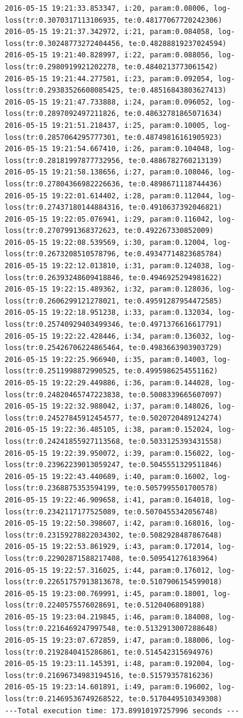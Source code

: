 \documentclass[11pt]{article}
\begin{document}
\begin{Verbatim}[commandchars=\\\{\}]
2016-05-15 19:21:33.853347, i:20, param:0.08006, log-loss(tr:0.3070317113106935, te:0.48177067720242306)
2016-05-15 19:21:37.342972, i:21, param:0.084058, log-loss(tr:0.30248773272404456, te:0.48288819237024594)
2016-05-15 19:21:40.828997, i:22, param:0.088056, log-loss(tr:0.2980919921202278, te:0.4840213773061542)
2016-05-15 19:21:44.277501, i:23, param:0.092054, log-loss(tr:0.29383526608085425, te:0.48516843803627413)
2016-05-15 19:21:47.733888, i:24, param:0.096052, log-loss(tr:0.2897092497211826, te:0.48632781865071634)
2016-05-15 19:21:51.218437, i:25, param:0.10005, log-loss(tr:0.2857064295777301, te:0.48749816161905923)
2016-05-15 19:21:54.667410, i:26, param:0.104048, log-loss(tr:0.28181997877732956, te:0.4886782760213139)
2016-05-15 19:21:58.138656, i:27, param:0.108046, log-loss(tr:0.27804366982226636, te:0.4898671118744436)
2016-05-15 19:22:01.614402, i:28, param:0.112044, log-loss(tr:0.27437180144884316, te:0.4910637392046821)
2016-05-15 19:22:05.076941, i:29, param:0.116042, log-loss(tr:0.2707991368372623, te:0.492267330852009)
2016-05-15 19:22:08.539569, i:30, param:0.12004, log-loss(tr:0.2673208510578796, te:0.49347714823685784)
2016-05-15 19:22:12.013810, i:31, param:0.124038, log-loss(tr:0.26393248609418846, te:0.4946925294981622)
2016-05-15 19:22:15.489362, i:32, param:0.128036, log-loss(tr:0.2606299121278021, te:0.49591287954472585)
2016-05-15 19:22:18.951238, i:33, param:0.132034, log-loss(tr:0.25740929403499346, te:0.4971376616617791)
2016-05-15 19:22:22.428446, i:34, param:0.136032, log-loss(tr:0.25426706224865464, te:0.4983663903903729)
2016-05-15 19:22:25.966940, i:35, param:0.14003, log-loss(tr:0.2511998872990525, te:0.4995986254551162)
2016-05-15 19:22:29.449886, i:36, param:0.144028, log-loss(tr:0.24820465747223838, te:0.5008339665607097)
2016-05-15 19:22:32.988042, i:37, param:0.148026, log-loss(tr:0.24527845912454577, te:0.5020720489124274)
2016-05-15 19:22:36.485105, i:38, param:0.152024, log-loss(tr:0.24241855927113568, te:0.5033125393431558)
2016-05-15 19:22:39.950072, i:39, param:0.156022, log-loss(tr:0.23962239013059247, te:0.5045551329511846)
2016-05-15 19:22:43.440689, i:40, param:0.16002, log-loss(tr:0.2368875353594199, te:0.5057995501700578)
2016-05-15 19:22:46.909658, i:41, param:0.164018, log-loss(tr:0.2342117177525089, te:0.5070455342056748)
2016-05-15 19:22:50.398607, i:42, param:0.168016, log-loss(tr:0.23159278822034302, te:0.5082928487867648)
2016-05-15 19:22:53.861929, i:43, param:0.172014, log-loss(tr:0.22902871588217408, te:0.509541276183964)
2016-05-15 19:22:57.316025, i:44, param:0.176012, log-loss(tr:0.22651757913813678, te:0.5107906154599018)
2016-05-15 19:23:00.769991, i:45, param:0.18001, log-loss(tr:0.2240575576028691, te:0.5120406809188)
2016-05-15 19:23:04.219845, i:46, param:0.184008, log-loss(tr:0.2216469247997548, te:0.5132913007288648)
2016-05-15 19:23:07.672859, i:47, param:0.188006, log-loss(tr:0.2192840415286861, te:0.514542315694976)
2016-05-15 19:23:11.145391, i:48, param:0.192004, log-loss(tr:0.21696734983194516, te:0.51579357816236)
2016-05-15 19:23:14.601891, i:49, param:0.196002, log-loss(tr:0.21469536749268522, te:0.5170449510349308)
---Total execution time: 173.89910197257996 seconds ---

    \end{Verbatim}
\end{document}

